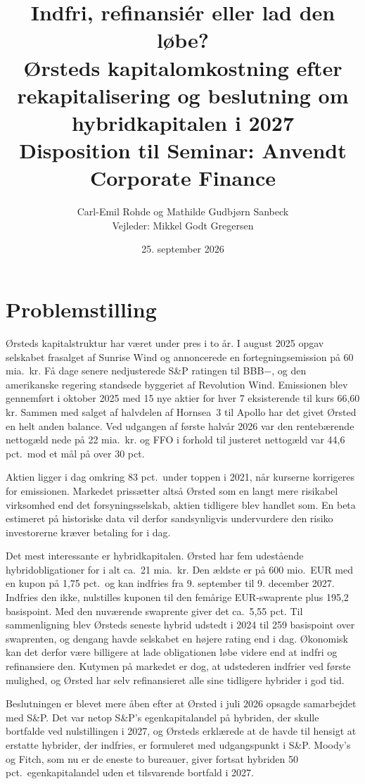 \documentclass[11pt,a4paper]{article}
\title{\textbf{Indfri, refinansiér eller lad den løbe?}\\[0.4em]
  \large Ørsteds kapitalomkostning efter rekapitalisering og beslutning om hybridkapitalen i 2027\\[0.8em]
  \normalsize Disposition til Seminar: Anvendt Corporate Finance}
\author{Carl-Emil Rohde og Mathilde Gudbjørn Sanbeck\\[0.2em]
  \small Vejleder: Mikkel Godt Gregersen}
\date{25. september 2026}
\begin{document}
\maketitle

\section{Problemstilling}

Ørsteds kapitalstruktur har været under pres i to år. I august 2025 opgav selskabet frasalget af Sunrise Wind og annoncerede en fortegningsemission på 60 mia.\ kr. Få dage senere nedjusterede S\&P ratingen til BBB$-$, og den amerikanske regering standsede byggeriet af Revolution Wind. Emissionen blev gennemført i oktober 2025 med 15 nye aktier for hver 7 eksisterende til kurs 66,60 kr. Sammen med salget af halvdelen af Hornsea~3 til Apollo har det givet Ørsted en helt anden balance. Ved udgangen af første halvår 2026 var den rentebærende nettogæld nede på 22 mia.\ kr. og FFO i forhold til justeret nettogæld var 44,6 pct.\ mod et mål på over 30 pct.

Aktien ligger i dag omkring 83 pct.\ under toppen i 2021, når kurserne korrigeres for emissionen. Markedet prissætter altså Ørsted som en langt mere risikabel virksomhed end det forsyningsselskab, aktien tidligere blev handlet som. En beta estimeret på historiske data vil derfor sandsynligvis undervurdere den risiko investorerne  kræver betaling for i dag.

Det mest interessante er hybridkapitalen. Ørsted har fem udestående hybridobligationer for i alt ca.\ 21 mia.\ kr. Den ældste er på 600 mio.\ EUR med en kupon på 1,75 pct.\ og kan indfries fra 9. september til 9. december 2027. Indfries den ikke, nulstilles kuponen til den femårige EUR-swaprente plus 195,2 basispoint. Med den nuværende swaprente giver det ca.\ 5,55 pct. Til sammenligning blev Ørsteds seneste hybrid udstedt i 2024 til 259 basispoint over swaprenten, og dengang havde selskabet en højere rating end i dag. Økonomisk kan det derfor være billigere at lade obligationen løbe videre end at indfri og refinansiere den. Kutymen på markedet er dog, at udstederen indfrier ved første mulighed, og Ørsted har selv refinansieret alle sine tidligere hybrider i god tid.

Beslutningen er blevet mere åben efter at Ørsted i juli 2026 opsagde samarbejdet med S\&P. Det var netop S\&P's egenkapitalandel på hybriden, der skulle bortfalde ved nulstillingen i 2027, og Ørsteds erklærede at de havde til hensigt at erstatte hybrider, der indfries, er formuleret med udgangspunkt i S\&P. Moody's og Fitch, som nu er de eneste to bureauer, giver fortsat hybriden 50 pct.\ egenkapitalandel uden et tilsvarende bortfald i 2027.
\end{document}
